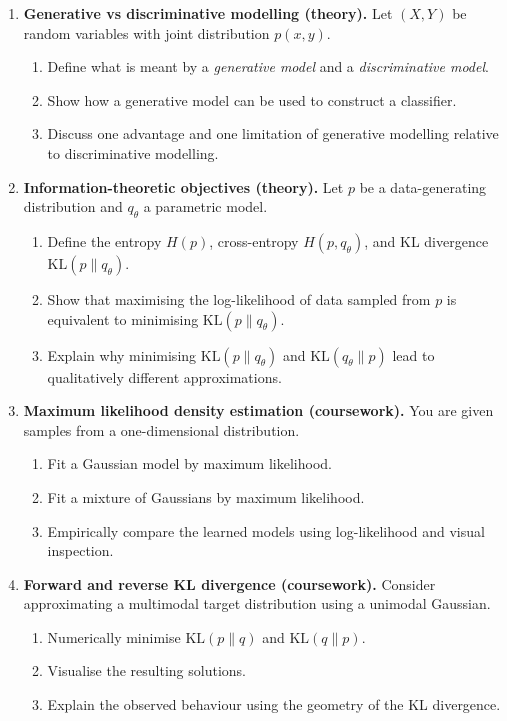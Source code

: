 \begin{enumerate}
    \item \textbf{Generative vs discriminative modelling (theory).}  
    Let $(X,Y)$ be random variables with joint distribution $p(x,y)$.  
    \begin{enumerate}
        \item Define what is meant by a \emph{generative model} and a \emph{discriminative model}.
        \item Show how a generative model can be used to construct a classifier.
        \item Discuss one advantage and one limitation of generative modelling relative to discriminative modelling.
    \end{enumerate}
    \item \textbf{Information-theoretic objectives  (theory).}  
    Let $p$ be a data-generating distribution and $q_\theta$ a parametric model.
    \begin{enumerate}
        \item Define the entropy $H(p)$, cross-entropy $H(p,q_\theta)$, and KL divergence $\mathrm{KL}(p\|q_\theta)$.
        \item Show that maximising the log-likelihood of data sampled from $p$ is equivalent to minimising $\mathrm{KL}(p\|q_\theta)$.
        \item Explain why minimising $\mathrm{KL}(p\|q_\theta)$ and $\mathrm{KL}(q_\theta\|p)$ lead to qualitatively different approximations.
    \end{enumerate}
    \item \textbf{Maximum likelihood density estimation  (coursework).}  
    You are given samples from a one-dimensional distribution.
    \begin{enumerate}
        \item Fit a Gaussian model by maximum likelihood.
        \item Fit a mixture of Gaussians by maximum likelihood.
        \item Empirically compare the learned models using log-likelihood and visual inspection.
    \end{enumerate}

    \item \textbf{Forward and reverse KL divergence   (coursework).}  
    Consider approximating a multimodal target distribution using a unimodal Gaussian.
    \begin{enumerate}
        \item Numerically minimise $\mathrm{KL}(p\|q)$ and $\mathrm{KL}(q\|p)$.
        \item Visualise the resulting solutions.
        \item Explain the observed behaviour using the geometry of the KL divergence.
    \end{enumerate}
\end{enumerate}